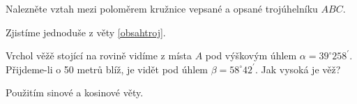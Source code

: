 \begin{priklad}
Nalezněte vztah mezi poloměrem kružnice vepsané a opsané trojúhelníku $ABC$.
\end{priklad}

\begin{reseni}
Zjistíme jednoduše z věty \ref{obsahtroj}.
\end{reseni}

\begin{priklad}
Vrchol věžě stojící na rovině vidíme z místa $A$ pod výškovým úhlem $\alpha= 39^\circ 258^\prime$.
Přijdeme-li o 50 metrů blíž, je vidět pod úhlem $\beta=58^\circ 42^\prime.$ Jak vysoká je věž?
\end{priklad}

\begin{reseni}
Použitím sinové a kosinové věty.
\end{reseni}
